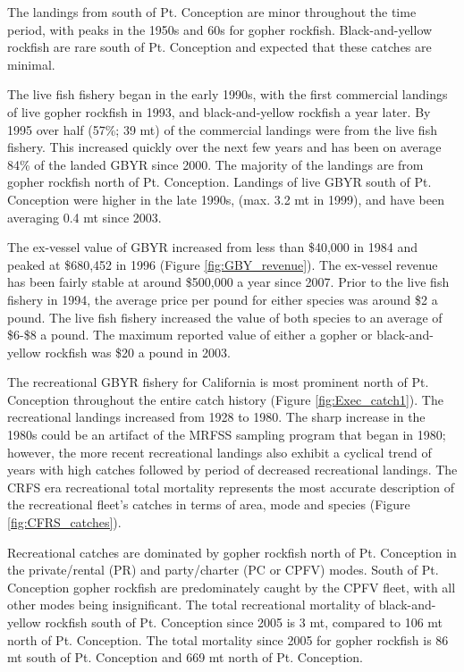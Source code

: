 \documentclass[12pt,]{article}
\begin{document}
The landings from south of Pt. Conception are minor throughout the time
period, with peaks in the 1950s and 60s for gopher rockfish.
Black-and-yellow rockfish are rare south of Pt. Conception and expected
that these catches are minimal.

The live fish fishery began in the early 1990s, with the first
commercial landings of live gopher rockfish in 1993, and
black-and-yellow rockfish a year later. By 1995 over half (57\%; 39 mt)
of the commercial landings were from the live fish fishery. This
increased quickly over the next few years and has been on average 84\%
of the landed GBYR since 2000. The majority of the landings are from
gopher rockfish north of Pt. Conception. Landings of live GBYR south of
Pt. Conception were higher in the late 1990s, (max. 3.2 mt in 1999), and
have been averaging 0.4 mt since 2003.

The ex-vessel value of GBYR increased from less than \$40,000 in 1984
and peaked at \$680,452 in 1996 (Figure \ref{fig:GBY_revenue}). The
ex-vessel revenue has been fairly stable at around \$500,000 a year
since 2007. Prior to the live fish fishery in 1994, the average price
per pound for either species was around \$2 a pound. The live fish
fishery increased the value of both species to an average of \$6-\$8 a
pound. The maximum reported value of either a gopher or black-and-yellow
rockfish was \$20 a pound in 2003.

The recreational GBYR fishery for California is most prominent north of
Pt. Conception throughout the entire catch history (Figure
\ref{fig:Exec_catch1}). The recreational landings increased from 1928 to
1980. The sharp increase in the 1980s could be an artifact of the MRFSS
sampling program that began in 1980; however, the more recent
recreational landings also exhibit a cyclical trend of years with high
catches followed by period of decreased recreational landings. The CRFS
era recreational total mortality represents the most accurate
description of the recreational fleet's catches in terms of area, mode
and species (Figure \ref{fig:CFRS_catches}).

Recreational catches are dominated by gopher rockfish north of Pt.
Conception in the private/rental (PR) and party/charter (PC or CPFV)
modes. South of Pt. Conception gopher rockfish are predominately caught
by the CPFV fleet, with all other modes being insignificant. The total
recreational mortality of black-and-yellow rockfish south of Pt.
Conception since 2005 is 3 mt, compared to 106 mt north of Pt.
Conception. The total mortality since 2005 for gopher rockfish is 86 mt
south of Pt. Conception and 669 mt north of Pt. Conception.
\end{document}
